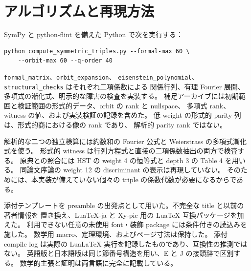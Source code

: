 \documentclass[12pt]{amsart}
\theoremstyle{definition}
\theoremstyle{remark}
\numberwithin{equation}{section}
\numberwithin{equation}{section}
\begin{document}
\section{アルゴリズムと再現方法}
SymPy と python-flint を備えた Python で次を実行する：
\begin{verbatim}
python compute_symmetric_triples.py --formal-max 60 \
    --orbit-max 60 --q-order 40
\end{verbatim}
\texttt{formal\_matrix}、\texttt{orbit\_expansion}、
\texttt{eisenstein\_polynomial}、\texttt{structural\_checks} はそれぞれ二項係数による
関係行列、有理 Fourier 展開、多項式の漸化式、明示的な障害の検査を実装する。
補足アーカイブには初期範囲と検証範囲の形式的データ、orbit の rank と nullspace、
多項式 rank、witness の値、および実装検証の記録を含めた。
低 weight の形式的 parity 列は、形式的商における像の rank であり、
解析的 parity rank ではない。

解析的な二つの独立検算には約数和の Fourier 公式と Weierstrass の多項式漸化式を使う。
形式的 witness は行列方程式と直接の二項係数抽出の両方で検査する。
原典との照合には HST の weight 4 の恒等式と depth 3 の Table 4 を用いる。
同論文序論の weight 12 の discriminant の表示は再現していない。
そのためには、本実装が備えていない個々の triple の係数代数が必要になるからである。

添付テンプレートを preamble の出発点として用いた。不完全な title と以前の著者情報を
置き換え、LuaTeX-ja と Xy-pic 用の LuaTeX 互換パッケージを加えた。
利用できない任意の未使用 font・装飾 package には条件付きの読込みを施した。
数学用 macro、定理環境、およびページ寸法は保持した。
添付 compile log は実際の LuaLaTeX 実行を記録したものであり、互換性の推測ではない。
英語版と日本語版は同じ節番号構造を用い、E と J の接頭辞で区別する。
数学的主張と証明は両言語に完全に記載している。
\end{document}
